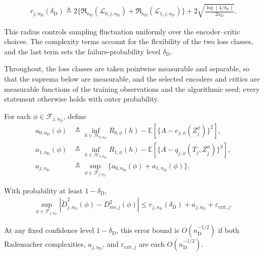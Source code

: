 \begin{align}
	r_{j,n_{\mathrm D}}(\delta_{\mathrm D})
	\triangleq
	2\{\mathfrak R_{n_{\mathrm D}}(\mathcal L_{0,j,n_{\mathrm D}})+\mathfrak R_{n_{\mathrm D}}(\mathcal L_{1,j,n_{\mathrm D}})\}
	+
	2\sqrt{\frac{\log(4/\delta_{\mathrm D})}{2n_{\mathrm D}}}.
	\label{eq:discrepancy-radius}
\end{align}

This radius controls sampling fluctuation uniformly over the encoder--critic choices. The complexity terms account for the flexibility of the two loss classes, and the last term sets the failure-probability level $\delta_{\mathrm D}$.

Throughout, the loss classes are taken pointwise measurable and separable, so that the suprema below are measurable, and the selected encoders and critics are measurable functions of the training observations and the algorithmic seed; every statement otherwise holds with outer probability.

\begin{proposition}
\label{prop:uniform-discrepancy-deviation}
\normalfont
For each $\phi\in\mathcal F_{j,n_{\mathrm D}}$, define
\begin{align}
	a_{0,n_{\mathrm D}}(\phi)
	&\triangleq
	\inf_{h\in\mathcal H_{0,n_{\mathrm D}}}R_{0,\phi}(h)
	-
	\mathbb E[\{A-e_{j,\phi}(Z_j^\phi)\}^2],\\
	a_{1,n_{\mathrm D}}(\phi)
	&\triangleq
	\inf_{h\in\mathcal H_{1,n_{\mathrm D}}}R_{1,\phi}(h)
	-
	\mathbb E[\{A-q_{j,\phi}(T_j,Z_j^\phi)\}^2],\\
	a_{j,n_{\mathrm D}}
	&\triangleq
	\sup_{\phi\in\mathcal F_{j,n_{\mathrm D}}}
	\{a_{0,n_{\mathrm D}}(\phi)+a_{1,n_{\mathrm D}}(\phi)\}.
	\label{eq:critic-approximation-error}
\end{align}

With probability at least $1-\delta_{\mathrm D}$,
\begin{align}
	\sup_{\phi\in\mathcal F_{j,n_{\mathrm D}}}
	|\widetilde D_{j,n_{\mathrm D}}^2(\phi)-D_{\mathrm{res},j}^2(\phi)|
	\le
	r_{j,n_{\mathrm D}}(\delta_{\mathrm D})+a_{j,n_{\mathrm D}}+\varepsilon_{\mathrm{crit},j}.
	\label{eq:uniform-discrepancy-deviation}
\end{align}
\end{proposition}
At any fixed confidence level $1-\delta_{\mathrm D}$, this error bound is $O(n_{\mathrm D}^{-1/2})$ if both Rademacher complexities, $a_{j,n_{\mathrm D}}$, and $\varepsilon_{\mathrm{crit},j}$ are each $O(n_{\mathrm D}^{-1/2})$.

